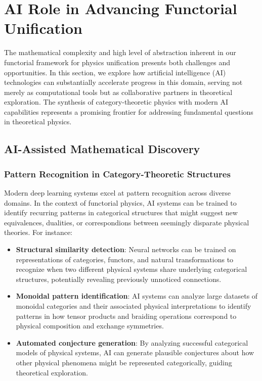 \section{AI Role in Advancing Functorial Unification}

The mathematical complexity and high level of abstraction inherent in our functorial framework for physics unification presents both challenges and opportunities. In this section, we explore how artificial intelligence (AI) technologies can substantially accelerate progress in this domain, serving not merely as computational tools but as collaborative partners in theoretical exploration. The synthesis of category-theoretic physics with modern AI capabilities represents a promising frontier for addressing fundamental questions in theoretical physics.

\subsection{AI-Assisted Mathematical Discovery}

\subsubsection{Pattern Recognition in Category-Theoretic Structures}

Modern deep learning systems excel at pattern recognition across diverse domains. In the context of functorial physics, AI systems can be trained to identify recurring patterns in categorical structures that might suggest new equivalences, dualities, or correspondions between seemingly disparate physical theories. For instance:

\begin{itemize}
    \item \textbf{Structural similarity detection}: Neural networks can be trained on representations of categories, functors, and natural transformations to recognize when two different physical systems share underlying categorical structures, potentially revealing previously unnoticed connections.
    
    \item \textbf{Monoidal pattern identification}: AI systems can analyze large datasets of monoidal categories and their associated physical interpretations to identify patterns in how tensor products and braiding operations correspond to physical composition and exchange symmetries.
    
    \item \textbf{Automated conjecture generation}: By analyzing successful categorical models of physical systems, AI can generate plausible conjectures about how other physical phenomena might be represented categorically, guiding theoretical exploration.
\end{itemize}

